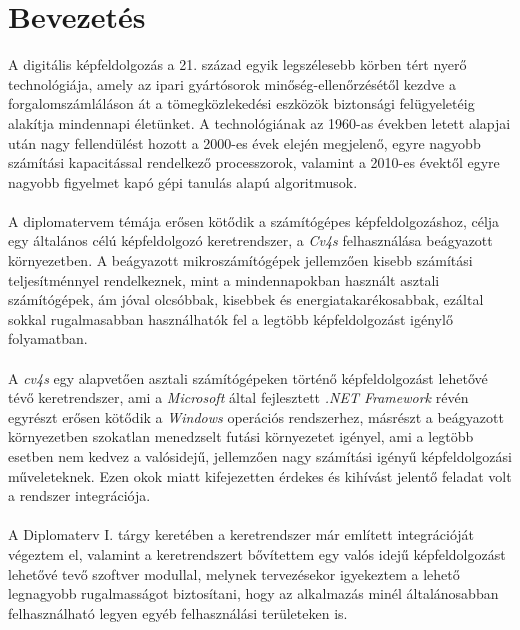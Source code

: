 \chapter{Bevezetés}

A digitális képfeldolgozás a 21. század egyik legszélesebb körben tért nyerő technológiája, amely az ipari gyártósorok minőség-ellenőrzésétől kezdve a forgalomszámláláson át a tömegközlekedési eszközök biztonsági felügyeletéig alakítja mindennapi életünket. A technológiának az 1960-as években letett alapjai után nagy fellendülést hozott a 2000-es évek elején megjelenő, egyre nagyobb számítási kapacitással rendelkező processzorok, valamint a 2010-es évektől egyre nagyobb figyelmet kapó gépi tanulás alapú algoritmusok.\\
\\
A diplomatervem témája erősen kötődik a számítógépes képfeldolgozáshoz, célja egy általános célú képfeldolgozó keretrendszer, a \emph{Cv4s} felhasználása beágyazott környezetben. A beágyazott mikroszámítógépek jellemzően kisebb számítási teljesítménnyel rendelkeznek, mint a mindennapokban használt asztali számítógépek, ám jóval olcsóbbak, kisebbek és energiatakarékosabbak, ezáltal sokkal rugalmasabban használhatók fel a legtöbb képfeldolgozást igénylő folyamatban. \\
\\
A \emph{cv4s} egy alapvetően asztali számítógépeken történő képfeldolgozást lehetővé tévő keretrendszer, ami a \textit{Microsoft} által fejlesztett \emph{.NET Framework} révén egyrészt erősen kötődik a \emph{Windows} operációs rendszerhez, másrészt a beágyazott környezetben szokatlan menedzselt futási környezetet igényel, ami a legtöbb esetben nem kedvez a valósidejű, jellemzően nagy számítási igényű képfeldolgozási műveleteknek. Ezen okok miatt kifejezetten érdekes és kihívást jelentő feladat volt a rendszer integrációja. \\
\\
A Diplomaterv I. tárgy keretében a keretrendszer már említett integrációját végeztem el, valamint a keretrendszert bővítettem egy valós idejű képfeldolgozást lehetővé tevő szoftver modullal, melynek tervezésekor igyekeztem a lehető legnagyobb rugalmasságot biztosítani, hogy az alkalmazás minél általánosabban felhasználható legyen egyéb felhasználási területeken is.